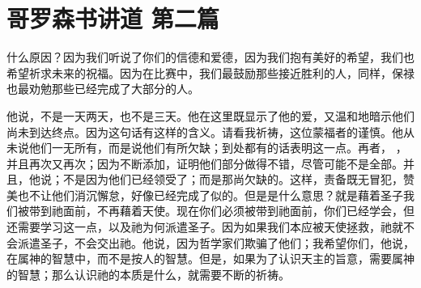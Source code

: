 

\section{哥罗森书讲道 第二篇}

\par

\par

什么原因？因为我们听说了你们的信德和爱德，因为我们抱有美好的希望，我们也希望祈求未来的祝福。因为在比赛中，我们最鼓励那些接近胜利的人，同样，保禄也最劝勉那些已经完成了大部分的人。\par

他说，不是一天两天，也不是三天。他在这里既显示了他的爱，又温和地暗示他们尚未到达终点。因为这句话有这样的含义。请看我祈祷，这位蒙福者的谨慎。他从未说他们一无所有，而是说他们有所欠缺；到处都有的话表明这一点。再者， ，并且再次又再次；因为不断添加，证明他们部分做得不错，尽管可能不是全部。并且，他说；不是因为他们已经领受了；而是那尚欠缺的。这样，责备既无冒犯，赞美也不让他们消沉懈怠，好像已经完成了似的。但是是什么意思？就是藉着圣子我们被带到祂面前，不再藉着天使。现在你们必须被带到祂面前，你们已经学会，但还需要学习这一点，以及祂为何派遣圣子。因为如果我们本应被天使拯救，祂就不会派遣圣子，不会交出祂。他说，因为哲学家们欺骗了他们；我希望你们，他说，在属神的智慧中，而不是按人的智慧。但是，如果为了认识天主的旨意，需要属神的智慧；那么认识祂的本质是什么，就需要不断的祈祷。\par

